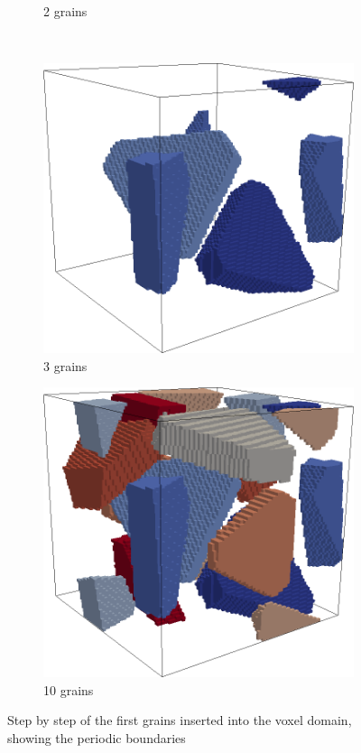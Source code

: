 \documentclass[3p,12pt]{elsarticle}
\begin{document}
\begin{figure}[H]
\begin{subfigure}[b]{0.23\linewidth}
  \caption{2 grains}
  \end{subfigure}
\\
  \begin{subfigure}[b]{0.23\linewidth}
  \includegraphics[width=1\linewidth]{step3}
  \caption{3 grains}
  \end{subfigure}
  \quad
  \begin{subfigure}[b]{0.23\linewidth}
  \includegraphics[width=1\linewidth]{step10}
  \caption{10 grains}
  \end{subfigure}

  \caption{\label{fig:ccbuilder_steps} Step by step of the first grains inserted into the voxel domain, showing the periodic boundaries}
\end{figure}
\end{document}
